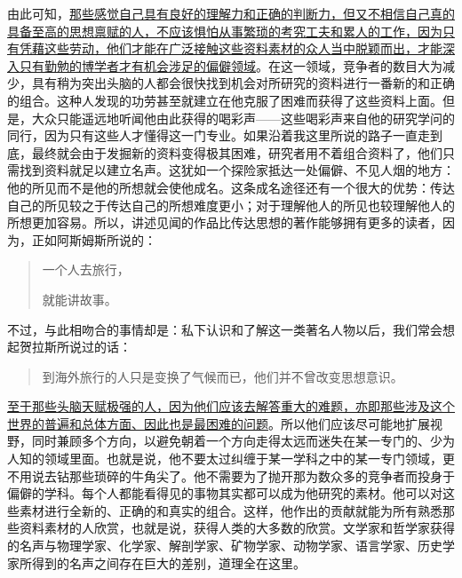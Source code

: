 \documentclass[12pt,oneside]{book}
\begin{document}
由此可知，\uline{那些感觉自己具有良好的理解力和正确的判断力，但又不相信自己真的具备至高的思想禀赋的人，不应该惧怕从事繁琐的考究工夫和累人的工作，因为只有凭藉这些劳动，他们才能在广泛接触这些资料素材的众人当中脱颖而出，才能深入只有勤勉的博学者才有机会涉足的偏僻领域}。在这一领域，竞争者的数目大为减少，具有稍为突出头脑的人都会很快找到机会对所研究的资料进行一番新的和正确的组合。这种人发现的功劳甚至就建立在他克服了困难而获得了这些资料上面。但是，大众只能遥远地听闻他由此获得的喝彩声——这些喝彩声来自他的研究学问的同行，因为只有这些人才懂得这一门专业。如果沿着我这里所说的路子一直走到底，最终就会由于发掘新的资料变得极其困难，研究者用不着组合资料了，他们只需找到资料就足以建立名声。这犹如一个探险家抵达一处偏僻、不见人烟的地方：他的所见而不是他的所想就会使他成名。这条成名途径还有一个很大的优势：传达自己的所见较之于传达自己的所想难度更小；对于理解他人的所见也较理解他人的所想更加容易。所以，讲述见闻的作品比传达思想的著作能够拥有更多的读者，因为，正如阿斯姆斯所说的： 

 
\begin{quotation}
一个人去旅行， 

就能讲故事。 
\end{quotation}


不过，与此相吻合的事情却是：私下认识和了解这一类著名人物以后，我们常会想起贺拉斯所说过的话： 

 
\begin{quotation}
到海外旅行的人只是变换了气候而已，他们并不曾改变思想意识。 
\end{quotation}
 

\uline{至于那些头脑天赋极强的人，因为他们应该去解答重大的难题，亦即那些涉及这个世界的普遍和总体方面、因此也是最困难的问题}。所以他们应该尽可能地扩展视野，同时兼顾多个方向，以避免朝着一个方向走得太远而迷失在某一专门的、少为人知的领域里面。也就是说，他不要太过纠缠于某一学科之中的某一专门领域，更不用说去钻那些琐碎的牛角尖了。他不需要为了抛开那为数众多的竞争者而投身于偏僻的学科。每个人都能看得见的事物其实都可以成为他研究的素材。他可以对这些素材进行全新的、正确的和真实的组合。这样，他作出的贡献就能为所有熟悉那些资料素材的人欣赏，也就是说，获得人类的大多数的欣赏。文学家和哲学家获得的名声与物理学家、化学家、解剖学家、矿物学家、动物学家、语言学家、历史学家所得到的名声之间存在巨大的差别，道理全在这里。 




\end{document}
